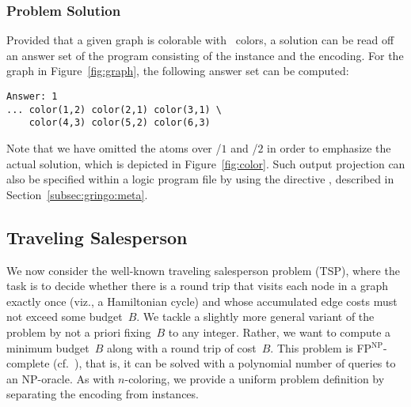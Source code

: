 \subsubsection{Problem Solution}\label{subsec:color:solution}


Provided that a given graph is colorable with~ colors,
a solution can be read off an answer set of the program consisting
of the instance and the encoding.
For the graph in Figure~\ref{fig:graph},
the following answer set can be computed:%
%
\begin{lstlisting}[numbers=none]
Answer: 1
... color(1,2) color(2,1) color(3,1) \
    color(4,3) color(5,2) color(6,3)
\end{lstlisting}
%
Note that we have omitted the atoms over %
/$1$ and %
/$2$ in order to emphasize the actual solution,
which is depicted in Figure~\ref{fig:color}.
Such output projection can also be specified within a logic program file by
using the directive \code{\#show},
described in Section~\ref{subsec:gringo:meta}.

\subsection{Traveling Salesperson}\label{subsec:ex:tsp}

We now consider the well-known traveling salesperson problem (TSP),
where the task is to decide whether there is a round trip that visits
each node in a graph exactly once (viz., a Hamiltonian cycle) and whose
accumulated edge costs must not exceed some budget~$B$.
We tackle a slightly more general variant of the problem by not
a priori fixing~$B$ to any integer.
Rather,
we want to compute a minimum budget~$B$ along with a round trip of cost~$B$.
This problem is FP$^\textrm{NP}$-complete (cf.~\cite{papadimitriou94a}),
that is, it can be solved with a polynomial number of queries to an NP-oracle.
As with $n$-coloring,
we provide a uniform problem definition by separating the encoding from instances.

